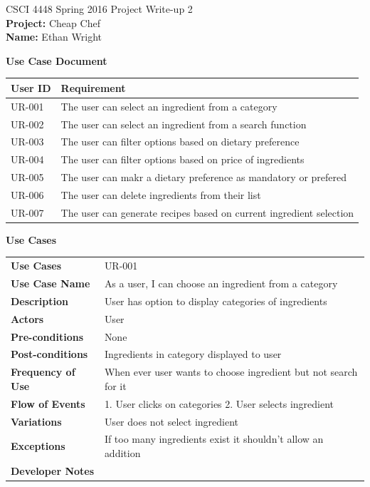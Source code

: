\documentclass[12pt]{article}
\begin{document}
CSCI 4448 Spring 2016 \hfill Project Write-up 2\\
\textbf{Project: } Cheap Chef \\
\textbf{Name: } Ethan Wright \\


\hrulefill
\begin{center}
  \textbf{Use Case Document}
  \begin{tabular}{l  l}
    \textbf{User ID} & \textbf{Requirement} \\ \hline \rowcolor[gray]{.95}
    UR-001 & The user can select an ingredient from a category \\ 
    UR-002 & The user can select an ingredient from a search function \\ \rowcolor[gray]{.95}
    UR-003 & The user can filter options based on dietary preference \\ 
    UR-004 & The user can filter options based on price of ingredients \\ \rowcolor[gray]{.95}
    UR-005 & The user can makr a dietary preference as mandatory or prefered \\
    UR-006 & The user can delete ingredients from their list \\ \rowcolor[gray]{.95}
    UR-007 & The user can generate recipes based on current ingredient selection \\ 
  \end{tabular}
\end{center}
\newpage
\begin{center}
  \textbf{Use Cases}
\end{center}
  \begin{tabular}{ l | l }
    \hline
    \textbf{Use Cases} & UR-001 \\ \rowcolor[gray]{.95}
    \textbf{Use Case Name} & As a user, I can choose an ingredient from a category \\ 
    \textbf{Description} & User has option to display categories of ingredients \\ \rowcolor[gray]{.95}
    \textbf{Actors} & User \\
    \textbf{Pre-conditions} & None \\ \rowcolor[gray]{.95}
    \textbf{Post-conditions} & Ingredients in category displayed to user \\ 
    \textbf{Frequency of Use} & When ever user wants to choose ingredient but not search for it \\ \rowcolor[gray]{.95}
    \textbf{Flow of Events} & 1. User clicks on categories   2. User selects ingredient \\
    \textbf{Variations} & User does not select ingredient \\  \rowcolor[gray]{.95}
    \textbf{Exceptions} & If too many ingredients exist it shouldn't allow an addition \\
    \textbf{Developer Notes} &  \\ \hline
  \end{tabular}
\end{document}
